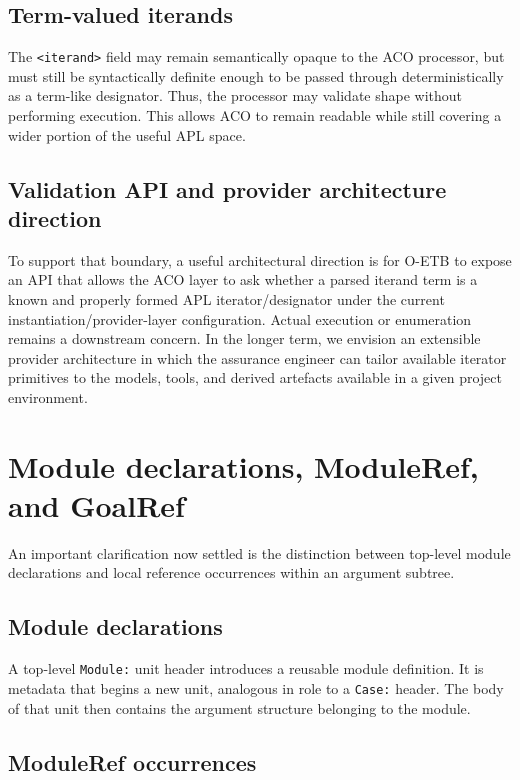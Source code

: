\documentclass[11pt,twoside,a4paper]{article}
\begin{document}
\subsection{Term-valued iterands}

The \texttt{<iterand>} field may remain semantically opaque to the ACO processor, but must still be syntactically definite enough to be passed through deterministically as a term-like designator.
Thus, the processor may validate shape without performing execution.
This allows ACO to remain readable while still covering a wider portion of the useful APL space.

\subsection{Validation API and provider architecture direction}

To support that boundary, a useful architectural direction is for O-ETB to expose an API that allows the ACO layer to ask whether a parsed iterand term is a known and properly formed APL iterator/designator under the current instantiation/provider-layer configuration.
Actual execution or enumeration remains a downstream concern.
In the longer term, we envision an extensible provider architecture in which the assurance engineer can tailor available iterator primitives to the models, tools, and derived artefacts available in a given project environment.

\section{Module declarations, ModuleRef, and GoalRef}

An important clarification now settled is the distinction between top-level module declarations and local reference occurrences within an argument subtree.

\subsection{Module declarations}

A top-level \texttt{Module:} unit header introduces a reusable module definition. It is metadata that begins a new unit, analogous in role to a \texttt{Case:} header. The body of that unit then contains the argument structure belonging to the module.

\subsection{ModuleRef occurrences}
\end{document}
